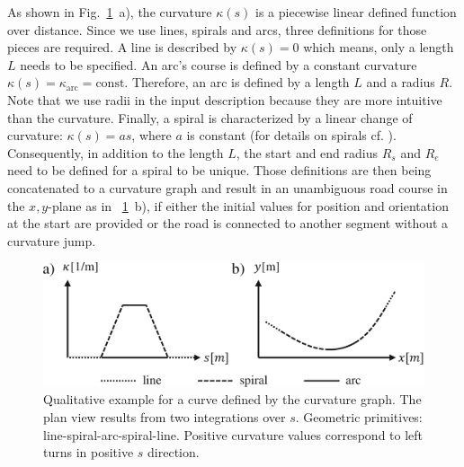 \documentclass[a4paper, 10pt, conference]{ieeeconf}      %
\begin{document}
As shown in Fig.~\ref{fig_curvGraph}~a), the curvature $\kappa(s)$ is a piecewise linear defined function over distance. Since we use lines, spirals and arcs, three definitions for those pieces are required. A line is described by $\kappa(s) = 0$ which means, only a length $L$ needs to be specified. An arc's course is defined by a constant curvature $\kappa(s) = \kappa_\text{arc} = \text{const}$. Therefore, an arc is defined by a length $L$ and a radius $R$. Note that we use radii in the input description because they are more intuitive than the curvature. Finally, a spiral is characterized by a linear change of curvature: $\kappa(s) = a s$, where $a$ is constant (for details on spirals cf. \cite{Baier.2008}). Consequently, in addition to the length $L$, the start and end radius $R_s$ and $R_e$ need to be defined for a spiral to be unique. Those definitions are then being concatenated to a curvature graph and result in an unambiguous road course in the $x,y$-plane as in ~\ref{fig_curvGraph}~b), if either the initial values for position and orientation at the start are provided or the road is connected to another segment without a curvature jump.

\begin{figure}%
	\centering
	\includegraphics{fig/curvGraph.pdf}
	\caption{Qualitative example for a curve defined by the curvature graph. The plan view results from two integrations over $s$. Geometric primitives: line-spiral-arc-spiral-line. Positive curvature values correspond to left turns in positive $s$ direction.}
	\label{fig_curvGraph}
\end{figure}
\end{document}
